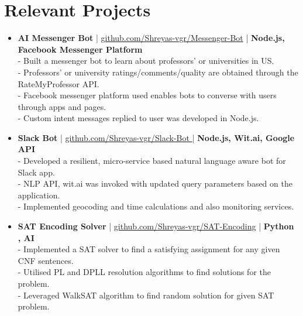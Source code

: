 \section{Relevant Projects}
\begin{itemize}
 \item \textbf{AI Messenger Bot} | \href{https://github.com/Shreyas-vgr/Messenger-Bot}{github.com/Shreyas-vgr/Messenger-Bot} | \textbf{Node.js, Facebook Messenger Platform}\\
 - Built a messenger bot to learn about professors' or universities in US.\\
 - Professors' or university ratings/comments/quality are obtained through the RateMyProfessor API.\\
 - Facebook messenger platform used enables bots to converse with users through apps and pages.\\
 - Custom intent messages replied to user was developed in Node.js.

 \item \textbf{Slack Bot} | \href{https://github.com/Shreyas-vgr/Slack-Bot}{github.com/Shreyas-vgr/Slack-Bot }| \textbf{Node.js, Wit.ai, Google API}\\
 - Developed a resilient, micro-service based natural language aware bot for Slack app.\\
 - NLP API, wit.ai was invoked with updated query parameters based on the application.\\
 - Implemented geocoding and time calculations and also monitoring services.

 \item \textbf{SAT Encoding Solver} | \href{https://github.com/Shreyas-vgr/SAT-Encoding}{github.com/Shreyas-vgr/SAT-Encoding} | \textbf{Python , AI}\\
 - Implemented a SAT solver to find a satisfying assignment for any given CNF sentences.\\
 - Utilised PL and DPLL resolution algorithms to find solutions for the problem.\\
 - Leveraged WalkSAT algorithm to find random solution for given SAT problem.



\end{itemize}
